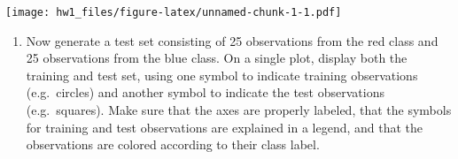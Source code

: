 \documentclass[]{article}
\providecommand{\tightlist}{%
  \setlength{\itemsep}{0pt}\setlength{\parskip}{0pt}}
\begin{document}
\texttt{[image: hw1\_files/figure-latex/unnamed-chunk-1-1.pdf]}

\begin{enumerate}
\def\labelenumi{(\alph{enumi})}
\setcounter{enumi}{1}
\tightlist
\item
  Now generate a test set consisting of 25 observations from the red
  class and 25 observations from the blue class. On a single plot,
  display both the training and test set, using one symbol to indicate
  training observations (e.g.~circles) and another symbol to indicate
  the test observations (e.g.~squares). Make sure that the axes are
  properly labeled, that the symbols for training and test observations
  are explained in a legend, and that the observations are colored
  according to their class label.
\end{enumerate}
\end{document}
